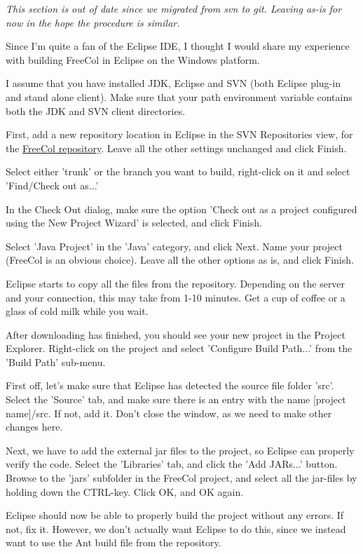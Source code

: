 \documentclass[12pt]{book}
\begin{document}
\emph{This section is out of date since we migrated from svn to git.
Leaving as-is for now in the hope the procedure is similar.}

Since I'm quite a fan of the Eclipse IDE, I thought I would share my
experience with building FreeCol in Eclipse on the Windows platform.

I assume that you have installed JDK, Eclipse and SVN (both Eclipse
plug-in and stand alone client). Make sure that your path environment
variable contains both the JDK and SVN client directories.

First, add a new repository location in Eclipse in the SVN
Repositories view, for the
\href{https://svn.freecol.org/svnroot/freecol/freecol/}{FreeCol
  repository}. Leave all the other settings unchanged and click
Finish.

Select either 'trunk' or the branch you want to build, right-click on
it and select 'Find/Check out as...'

In the Check Out dialog, make sure the option 'Check out as a project
configured using the New Project Wizard' is selected, and click
Finish.

Select 'Java Project' in the 'Java' category, and click Next. Name
your project (FreeCol is an obvious choice). Leave all the other
options as is, and click Finish.

Eclipse starts to copy all the files from the repository. Depending on
the server and your connection, this may take from 1-10 minutes. Get a
cup of coffee or a glass of cold milk while you wait.

After downloading has finished, you should see your new project in the
Project Explorer. Right-click on the project and select 'Configure
Build Path...' from the 'Build Path' sub-menu.

First off, let's make sure that Eclipse has detected the source file
folder 'src'. Select the 'Source' tab, and make sure there is an entry
with the name [project name]/src. If not, add it. Don't close the
window, as we need to make other changes here.

Next, we have to add the external jar files to the project, so Eclipse
can properly verify the code. Select the 'Libraries' tab, and click
the 'Add JARs...' button. Browse to the 'jars' subfolder in the
FreeCol project, and select all the jar-files by holding down the
CTRL-key. Click OK, and OK again.

Eclipse should now be able to properly build the project without any
errors. If not, fix it. However, we don't actually want Eclipse to do
this, since we instead want to use the Ant build file from the
repository.
\end{document}

